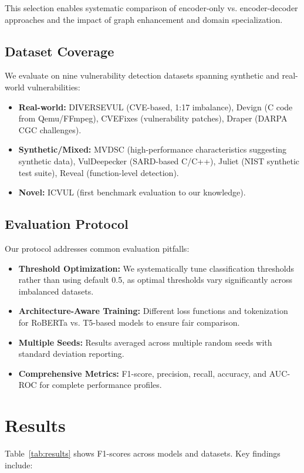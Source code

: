 \documentclass[letterpaper]{article}
\begin{document}
This selection enables systematic comparison of encoder-only vs. encoder-decoder approaches and the impact of graph enhancement and domain specialization.

\subsection{Dataset Coverage}
We evaluate on nine vulnerability detection datasets spanning synthetic and real-world vulnerabilities:
\begin{itemize}
	\item \textbf{Real-world:} DIVERSEVUL (CVE-based, 1:17 imbalance), Devign (C code from Qemu/FFmpeg), CVEFixes (vulnerability patches), Draper (DARPA CGC challenges).
	\item \textbf{Synthetic/Mixed:} MVDSC (high-performance characteristics suggesting synthetic data), VulDeepecker (SARD-based C/C++), Juliet (NIST synthetic test suite), Reveal (function-level detection).
	\item \textbf{Novel:} ICVUL (first benchmark evaluation to our knowledge).
\end{itemize}

\subsection{Evaluation Protocol}
Our protocol addresses common evaluation pitfalls:

\begin{itemize}
	\item \textbf{Threshold Optimization:} We systematically tune classification thresholds rather than using default 0.5, as optimal thresholds vary significantly across imbalanced datasets.
	\item \textbf{Architecture-Aware Training:} Different loss functions and tokenization for RoBERTa vs. T5-based models to ensure fair comparison.
	\item \textbf{Multiple Seeds:} Results averaged across multiple random seeds with standard deviation reporting.
	\item \textbf{Comprehensive Metrics:} F1-score, precision, recall, accuracy, and AUC-ROC for complete performance profiles.
\end{itemize}

\section{Results}

Table~\ref{tab:results} shows F1-scores across models and datasets. Key findings include:
\end{document}
